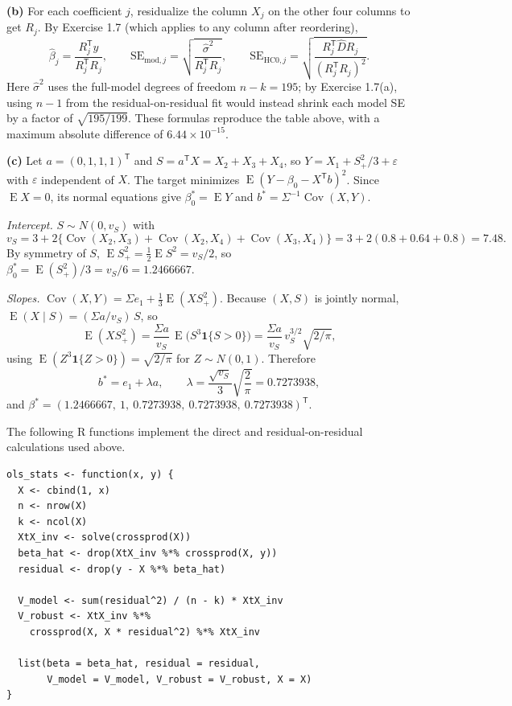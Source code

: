 \documentclass[answers,12pt,addpoints]{exam}
\providecommand{\E}{\operatorname{E}}
\newcommand{\trans}{^{\mathsf T}}
\newcommand{\ind}{\mathbf{1}}   %
\begin{document}
\begin{questions}
\begin{solution}
\textbf{(b)} For each coefficient $j$, residualize the column $X_j$ on the
other four columns to get $R_j$. By Exercise 1.7 (which applies to any column
after reordering),
\[
\widehat\beta_j=\frac{R_j\trans y}{R_j\trans R_j},
\qquad
\mathrm{SE}_{\mathrm{mod},j}=\sqrt{\frac{\widehat\sigma^2}{R_j\trans R_j}},
\qquad
\mathrm{SE}_{\mathrm{HC0},j}=\sqrt{\frac{R_j\trans\widehat DR_j}{(R_j\trans R_j)^2}}.
\]
Here $\widehat\sigma^2$ uses the full-model degrees of freedom $n-k=195$; by
Exercise 1.7(a), using $n-1$ from the residual-on-residual fit would instead
shrink each model SE by a factor of $\sqrt{195/199}$. These formulas reproduce
the table above, with a maximum absolute difference of $6.44\times10^{-15}$.
 
\textbf{(c)} Let $a=(0,1,1,1)\trans$ and $S=a\trans X=X_2+X_3+X_4$, so
$Y=X_1+S_+^2/3+\varepsilon$ with $\varepsilon$ independent of $X$. The target
minimizes $\E(Y-\beta_0-X\trans b)^2$. Since $\E X=0$, its normal equations
give $\beta_0^*=\E Y$ and $b^*=\Sigma^{-1}\operatorname{Cov}(X,Y)$.
 
\emph{Intercept.} $S\sim N(0,v_S)$ with
\[
v_S=3+2\{\operatorname{Cov}(X_2,X_3)+\operatorname{Cov}(X_2,X_4)
+\operatorname{Cov}(X_3,X_4)\}=3+2(0.8+0.64+0.8)=7.48 .
\]
By symmetry of $S$, $\E S_+^2=\frac12\E S^2=v_S/2$, so
$\beta_0^*=\E(S_+^2)/3=v_S/6=1.2466667$.
 
\emph{Slopes.} $\operatorname{Cov}(X,Y)=\Sigma e_1+\frac13\E(XS_+^2)$. Because
$(X,S)$ is jointly normal, $\E(X\mid S)=(\Sigma a/v_S)\,S$, so
\[
\E(XS_+^2)=\frac{\Sigma a}{v_S}\,\E\bigl(S^3\ind\{S>0\}\bigr)
=\frac{\Sigma a}{v_S}\,v_S^{3/2}\sqrt{2/\pi},
\]
using $\E(Z^3\ind\{Z>0\})=\sqrt{2/\pi}$ for $Z\sim N(0,1)$. Therefore
\[
b^*=e_1+\lambda a,\qquad
\lambda=\frac{\sqrt{v_S}}{3}\sqrt{\frac2\pi}=0.7273938,
\]
and
$\beta^*=(1.2466667,\ 1,\ 0.7273938,\ 0.7273938,\ 0.7273938)\trans$.
 
The following R functions implement the direct and residual-on-residual
calculations used above.
\begin{lstlisting}
ols_stats <- function(x, y) {
  X <- cbind(1, x)
  n <- nrow(X)
  k <- ncol(X)
  XtX_inv <- solve(crossprod(X))
  beta_hat <- drop(XtX_inv %*% crossprod(X, y))
  residual <- drop(y - X %*% beta_hat)
 
  V_model <- sum(residual^2) / (n - k) * XtX_inv
  V_robust <- XtX_inv %*%
    crossprod(X, X * residual^2) %*% XtX_inv
 
  list(beta = beta_hat, residual = residual,
       V_model = V_model, V_robust = V_robust, X = X)
}
 

\end{lstlisting}
\end{solution}
\end{questions}
\end{document}
